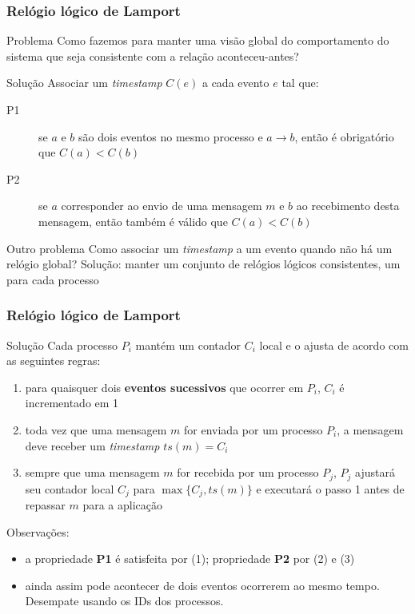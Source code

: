 \documentclass[Ligatures=TeX,table,brazil,svgnames,usetotalslideindicator,compress,10pt]{beamer}
\begin{document}
\begin{frame}
  \frametitle{Relógio lógico de Lamport}
  \begin{alertblock}{Problema}
    Como fazemos para manter uma visão global do comportamento do sistema que seja consistente com a relação aconteceu-antes?
  \end{alertblock}

  \pause
  \begin{block}{Solução}
    Associar um \textit{timestamp} $C(e)$ a cada evento $e$ tal que:
    \begin{description}
    \item[P1] se $a$ e $b$ são dois eventos no mesmo processo e $a \rightarrow b$, então é obrigatório que $C(a) < C(b)$
    \item[P2] se $a$ corresponder ao envio de uma mensagem $m$ e $b$ ao recebimento desta mensagem, então também é válido que $C(a) < C(b)$
    \end{description}
  \end{block}

  \pause
  \begin{alertblock}{Outro problema}
    Como associar um \textit{timestamp} a um evento quando não há um relógio global? Solução: manter um conjunto de relógios lógicos \alert{consistentes}, um para cada processo
  \end{alertblock}

\end{frame}

\begin{frame}
  \frametitle{Relógio lógico de Lamport}

  \begin{block}{Solução}
    Cada processo $P_i$ mantém um contador $C_i$ \alert{local} e o ajusta de acordo com as seguintes regras:
    \begin{enumerate}
    \item para quaisquer dois \textbf{eventos sucessivos} que ocorrer em $P_i$, $C_i$ é incrementado em 1
    \item toda vez que uma mensagem $m$ for \alert{enviada} por um processo $P_i$, a mensagem deve receber um \textit{timestamp} $ts(m) = C_i$
    \item sempre que uma mensagem $m$ for \alert{recebida} por um processo $P_j$, $P_j$ ajustará seu contador local $C_j$ para \alert{$\max\{C_j, ts(m)\}$} e executará o passo 1 antes de repassar $m$ para a aplicação
    \end{enumerate}
  \end{block}

  \begin{block}{Observações:}
    \begin{itemize}
    \item a propriedade \textbf{P1} é satisfeita por (1); propriedade \textbf{P2} por (2) e (3)
    \item ainda assim pode acontecer de dois eventos ocorrerem ao mesmo tempo. \alert{Desempate usando os IDs dos processos}.
    \end{itemize}
  \end{block}

\end{frame}
\end{document}
